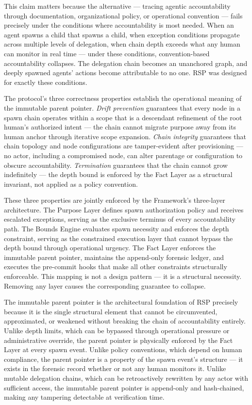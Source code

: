 This claim matters because the alternative — tracing agentic accountability through documentation, organizational policy, or operational convention — fails precisely under the conditions where accountability is most needed. When an agent spawns a child that spawns a child, when exception conditions propagate across multiple levels of delegation, when chain depth exceeds what any human can monitor in real time — under these conditions, convention-based accountability collapses. The delegation chain becomes an unanchored graph, and deeply spawned agents' actions become attributable to no one. RSP was designed for exactly these conditions.

The protocol's three correctness properties establish the operational meaning of the immutable parent pointer. \emph{Drift prevention} guarantees that every node in a spawn chain operates within a scope that is a descendant refinement of the root human's authorized intent — the chain cannot migrate purpose away from its human anchor through iterative scope expansion. \emph{Chain integrity} guarantees that chain topology and node configurations are tamper-evident after provisioning — no actor, including a compromised node, can alter parentage or configuration to obscure accountability. \emph{Termination} guarantees that the chain cannot grow indefinitely — the depth bound is enforced by the Fact Layer as a structural invariant, not applied as a policy convention.

These three properties are jointly enforced by the \bxthree{} Framework's three-layer architecture. The Purpose Layer defines spawn authorization policy and receives escalated exceptions, serving as the exclusive terminus of every accountability path. The Bounds Engine evaluates spawn necessity and enforces the depth constraint, serving as the constrained execution layer that cannot bypass the depth bound through operational urgency. The Fact Layer enforces the immutable parent pointer, maintains the append-only forensic ledger, and executes the pre-commit hooks that make all other constraints structurally enforceable. This mapping is not a design pattern — it is a structural necessity. Removing any layer causes the corresponding guarantee to collapse.

The immutable parent pointer is the architectural foundation of RSP precisely because it is the single structural element that cannot be circumvented, approximated, or weakened without breaking the chain of accountability entirely. Unlike depth limits, which can be bypassed through operational pressure or administrative override, the parent pointer is physically enforced by the Fact Layer at every spawn event. Unlike policy conventions, which depend on human compliance, the parent pointer is a property of the spawn event's structure — it exists in the forensic record whether or not any human monitors it. Unlike mutable delegation chains, which can be retroactively rewritten by any actor with sufficient access, the immutable parent pointer is append-only and hash-chained, making any tampering detectable at verification time.


